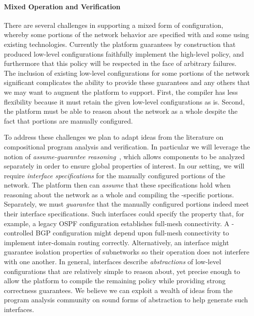 \paragraph{Mixed Operation and Verification} There are several challenges in supporting a mixed form of configuration, whereby some portions of the network behavior are specified with \Name and some using existing technologies.  Currently the \Propane platform guarantees by construction that produced low-level configurations faithfully implement the high-level policy, and furthermore that this policy will be respected in the face of arbitrary failures.  The inclusion of existing low-level configurations for some portions of the network significant complicates the ability to provide these guarantees and any others that we may want to augment the platform to support. First, the \Name compiler has less flexibility because it must retain the given low-level configurations as is.  Second, the \Name platform must be able to reason about the network as a whole despite the fact that portions are manually configured.

To address these challenges we plan to adapt ideas from the literature on compositional program analysis and verification.  In particular we will leverage the notion of {\em assume-guarantee reasoning}~\cite{Jones:assume-guarantee,Pnueli84}, which allows components to be analyzed separately in order to ensure global properties of interest.  In our setting, we will require {\em interface specifications} for the manually configured portions of the network. 
The \Name platform then can {\em assume} that these specifications hold when reasoning about the network as a whole and compiling the \Name-specific portions.  Separately, we must {\em guarantee} that the manually configured portions indeed meet their interface specifications.
Such interfaces could specify the property that, for example, a legacy OSPF configuration establishes full-mesh connectivity.  A
\Name-controlled BGP configuration might depend upon full-mesh connectivity to implement inter-domain routing correctly.
Alternatively, an interface might guarantee isolation properties of subnetworks so their
operation does not interfere with one another. In general, interfaces 
describe {\em abstractions} of low-level configurations that are relatively simple to reason about, yet precise enough to allow the platform to compile the remaining \Name policy while providing strong correctness guarantees.
We believe we can exploit a wealth of ideas from the program analysis community on sound forms of abstraction
to help generate such interfaces. 

